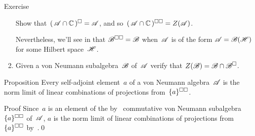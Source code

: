 \documentclass[a]{subfiles}
\begin{document}
\begin{parsec}
\begin{point}{Exercise}
\begin{enumerate}
Show that~$(\,\mathscr{A}\cap \mathbb{C}\,)^\square=\mathscr{A}$,
and so~$(\,\mathscr{A}\cap\mathbb{C}\,)^{\square\square} = Z(\mathscr{A})$.

Nevertheless,
we'll see in  that $\mathscr{B}^{\square\square}=\mathscr{B}$
when~$\mathscr{A}$ is of the form $\mathscr{A}=\mathscr{B}(\mathscr{H})$
for some Hilbert space~$\mathscr{H}$.
\item
Given a von Neumann subalgebra~$\mathscr{B}$
of~$\mathscr{A}$
verify that $Z(\mathscr{B})=\mathscr{B}\cap \mathscr{B}^{\square}$.
\end{enumerate}
\end{point}
\begin{point}{Proposition}%
Every self-adjoint element~$a$ of a von Neumann algebra~$\mathscr{A}$
is the norm limit
of linear combinations
of projections from~$\smash{\{a\}}^{\square\square}$.
\begin{point}{Proof}%
Since~$a$ is an element
of the by~
commutative von Neumann subalgebra~$\smash{\{a\}}^{\square\square}$
of~$\mathscr{A}$,
$a$ is the norm limit of linear combinations
of projections from~$\smash{\{a\}}^{\square\square}$
by~.\qed
\end{point}
\end{point}
\end{parsec}
\end{document}
